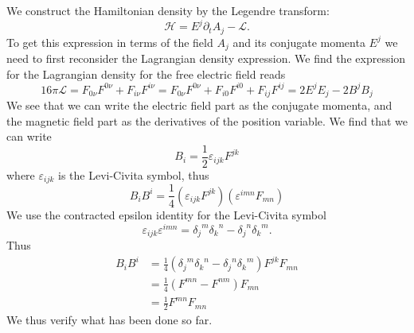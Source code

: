 We construct the Hamiltonian density by the Legendre transform:
\begin{equation}%
\mathcal{H} = E^{j}\partial_{t}A_{j} - \mathcal{L}.
\end{equation}
To get this expression in terms of the field $A_{j}$ and its
conjugate momenta $E^{j}$ we need to first reconsider the
Lagrangian density expression. We find the expression for the
Lagrangian density for the free electric field reads
\begin{equation}%
16\pi\mathcal{L} = F_{0\nu}F^{0\nu} + F_{i\nu}F^{i\nu} =
F_{0\nu}F^{0\nu} + F_{i0}F^{i0} + F_{ij}F^{ij} = 2E^{j}E_{j}-2B^{j}B_{j}
\end{equation}
We see that we can write the electric field part as the conjugate
momenta, and the magnetic field part as the derivatives of the
position variable. We find that we can write
\begin{equation}%
B_{i} = \frac{1}{2}\varepsilon_{ijk}F^{jk}
\end{equation}
where $\varepsilon_{ijk}$ is the Levi-Civita symbol, thus
\begin{equation}%
B_{i}B^{i} = \frac{1}{4}\left(\varepsilon_{ijk}F^{jk}\right)\left(\varepsilon^{imn}F_{mn}\right)
\end{equation}
We use the contracted epsilon identity for the Levi-Civita symbol
\begin{equation}%
 \varepsilon_{ijk}\varepsilon^{imn} = {\delta_{j}}^{m}{\delta_{k}}^{n} - {\delta_{j}}^{n}{\delta_{k}}^{m}.
\end{equation}
Thus
\begin{subequations}
\begin{align}
B_{i}B^{i} &= \frac{1}{4}({\delta_{j}}^{m}{\delta_{k}}^{n} - {\delta_{j}}^{n}{\delta_{k}}^{m})F^{jk}F_{mn}\\
&= \frac{1}{4}(F^{mn}-F^{nm})F_{mn}\\
&= \frac{1}{2}F^{mn}F_{mn}
\end{align}
\end{subequations}
We thus verify what has been done so far.

